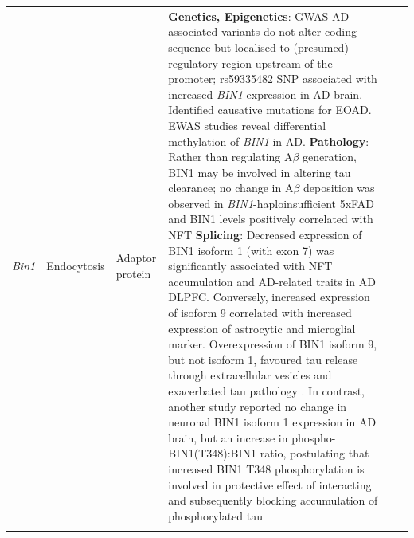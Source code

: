 \begin{changemargin}{1.5cm}
\begin{landscape}
\begin{longtable}[c]{p{1cm}p{2cm}p{4cm}p{16cm}p{1cm}p{1cm}}
			\centering \textit{Bin1} &
			\centering Endocytosis  &
			\centering Adaptor protein &
			\tabitem \textbf{Genetics, Epigenetics}: GWAS AD-associated variants do not alter coding sequence but localised to (presumed) regulatory region upstream of the promoter; rs59335482 SNP associated with increased \textit{BIN1} expression in AD brain\cite{Chapuis2013}. Identified causative mutations for EOAD.  EWAS studies reveal differential methylation of \textit{BIN1} in AD.  \newline
			\tabitem \textbf{Pathology}: Rather than regulating A$\beta$ generation, BIN1 may be involved in altering tau clearance; no change in A$\beta$ deposition was observed in \textit{BIN1}-haploinsufficient 5xFAD \cite{Andrew2019} and BIN1 levels positively correlated with NFT\cite{Crotti2019}\newline 
			\tabitem \textbf{Splicing}: Decreased expression of BIN1 isoform 1 (with exon 7) was significantly associated with NFT accumulation and AD-related traits in AD DLPFC\cite{Taga2020}. Conversely, increased expression of isoform 9 correlated with increased expression of astrocytic and microglial marker\cite{Taga2020}. Overexpression of BIN1 isoform 9, but not isoform 1, favoured tau release through extracellular vesicles and exacerbated tau pathology \cite{Crotti2019}. \newline
			\tabitem In contrast, another study reported no change in neuronal BIN1 isoform 1 expression in AD brain, but an increase in phospho-BIN1(T348):BIN1 ratio, postulating that increased BIN1 T348 phosphorylation is involved in protective effect of interacting and subsequently blocking accumulation of phosphorylated tau\cite{Sartori2019} \\
			\hdashline[0.5pt/5pt]
			

\end{longtable}
\end{landscape}
\end{changemargin}
